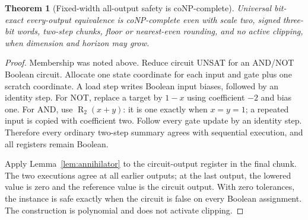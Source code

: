 \documentclass[11pt]{article}
\newtheorem{theorem}[definition]{Theorem}
\newcommand{\R}{\operatorname{R}}
\begin{document}
\begin{theorem}[Fixed-width all-output safety is coNP-complete]\label{thm:fixed-hard}
Universal bit-exact every-output equivalence is coNP-complete even with scale two, signed three-bit words, two-step chunks, floor or nearest-even rounding, and no active clipping, when dimension and horizon may grow.
\end{theorem}
\begin{proof}
Membership was noted above. Reduce circuit UNSAT for an AND/NOT Boolean circuit. Allocate one state coordinate for each input and gate plus one scratch coordinate. A load step writes Boolean input biases, followed by an identity step. For NOT, replace a target by $1-x$ using coefficient $-2$ and bias one. For AND, use
$\R_2(x+y)$: it is one exactly when $x=y=1$; a repeated input is copied with coefficient two. Follow every gate update by an identity step. Therefore every ordinary two-step summary agrees with sequential execution, and all registers remain Boolean.

Apply Lemma~\ref{lem:annihilator} to the circuit-output register in the final chunk. The two executions agree at all earlier outputs; at the last output, the lowered value is zero and the reference value is the circuit output. With zero tolerances, the instance is safe exactly when the circuit is false on every Boolean assignment. The construction is polynomial and does not activate clipping.
\end{proof}
\end{document}
